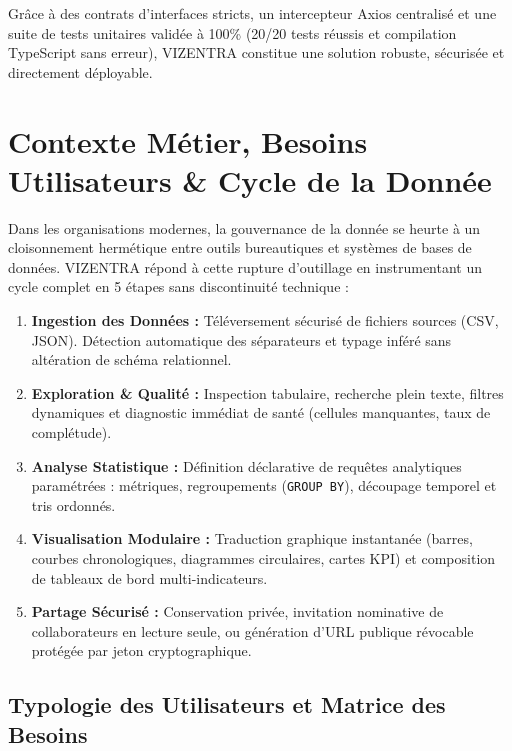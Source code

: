 \documentclass[11pt,a4paper]{article}
\begin{document}
Grâce à des contrats d'interfaces stricts, un intercepteur Axios centralisé et une suite de tests unitaires validée à 100\% (20/20 tests réussis et compilation TypeScript sans erreur), VIZENTRA constitue une solution robuste, sécurisée et directement déployable.

\section{Contexte Métier, Besoins Utilisateurs \& Cycle de la Donnée}

Dans les organisations modernes, la gouvernance de la donnée se heurte à un cloisonnement hermétique entre outils bureautiques et systèmes de bases de données. VIZENTRA répond à cette rupture d'outillage en instrumentant un cycle complet en 5 étapes sans discontinuité technique :

\begin{enumerate}[leftmargin=1.5cm, label=\textbf{\color{brandblue}Étape \arabic* —}]
    \item \textbf{Ingestion des Données :} Téléversement sécurisé de fichiers sources (CSV, JSON). Détection automatique des séparateurs et typage inféré sans altération de schéma relationnel.
    \item \textbf{Exploration \& Qualité :} Inspection tabulaire, recherche plein texte, filtres dynamiques et diagnostic immédiat de santé (cellules manquantes, taux de complétude).
    \item \textbf{Analyse Statistique :} Définition déclarative de requêtes analytiques paramétrées : métriques, regroupements (\texttt{GROUP BY}), découpage temporel et tris ordonnés.
    \item \textbf{Visualisation Modulaire :} Traduction graphique instantanée (barres, courbes chronologiques, diagrammes circulaires, cartes KPI) et composition de tableaux de bord multi-indicateurs.
    \item \textbf{Partage Sécurisé :} Conservation privée, invitation nominative de collaborateurs en lecture seule, ou génération d'URL publique révocable protégée par jeton cryptographique.
\end{enumerate}

\subsection{Typologie des Utilisateurs et Matrice des Besoins}
\end{document}
